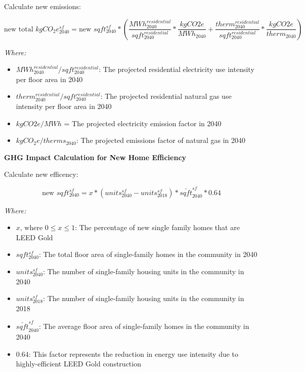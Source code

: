 \documentclass[
]{book}
\providecommand{\tightlist}{%
  \setlength{\itemsep}{0pt}\setlength{\parskip}{0pt}}
\begin{document}
Calculate new emissions:

\[\text{new total }kgCO_2e^{sf}_{2040} = \text{new }sqft_{2040}^{sf} *  \left( \frac{MWh_{2040}^{residential}}{sqft_{2040}^{residential}} * \frac{kgCO2e}{MWh_{2040}} + \frac{therm_{2040}^{residential}}{sqft_{2040}^{residential}} * \frac{kgCO2e}{therm_{2040}} \right)\]

\emph{Where:}

\begin{itemize}
\tightlist
\item
  \(MWh_{2040}^{residential}/sqft_{2040}^{residential}\): The projected residential electricity use intensity per floor area in 2040
\item
  \(therm_{2040}^{residential}/sqft_{2040}^{residential}\): The projected residential natural gas use intensity per floor area in 2040
\item
  \(kgCO2e/MWh\) = The projected electricity emission factor in 2040
\item
  \(kgCO_2e/therms_{2040}\): The projected emissions factor of natural gas in 2040
\end{itemize}

\textbf{GHG Impact Calculation for New Home Efficiency}

Calculate new efficency:

\[\text{new } sqft_{2040}^{sf} = x * (units_{2040}^{sf}-units_{2018}^{sf}) * \bar{sqft}_{2040}^{sf} * 0.64\]

\emph{Where:}

\begin{itemize}
\tightlist
\item
  \(x \text{, where } 0 \le x \le 1\): The percentage of new single family homes that are LEED Gold
\item
  \(sqft_{2040}^{sf}\): The total floor area of single-family homes in the community in 2040
\item
  \(units_{2040}^{sf}\): The number of single-family housing units in the community in 2040
\item
  \(units_{2018}^{sf}\): The number of single-family housing units in the community in 2018
\item
  \(\bar{sqft}_{2040}^{sf}\): The average floor area of single-family homes in the community in 2040
\item
  \(0.64\): This factor represents the reduction in energy use intensity due to highly-efficient LEED Gold construction
\end{itemize}
\end{document}
